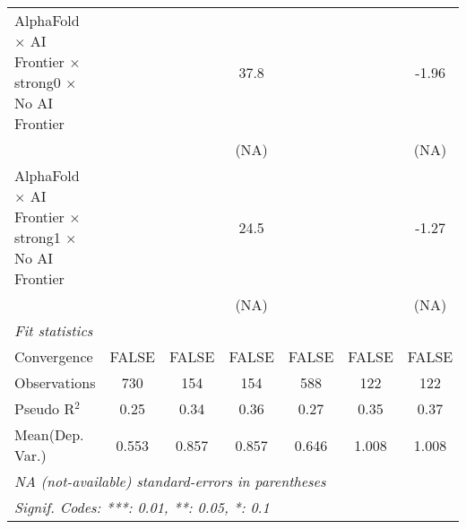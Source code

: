 \begin{tabular}{lcccccc}
   AlphaFold $\times$ AI Frontier $\times$ strong0 $\times$ No AI Frontier    &                        &       & 37.8   &                        &       & -1.96\\   
                                                                              &                        &       & (NA)   &                        &       & (NA)\\   
   AlphaFold $\times$ AI Frontier $\times$ strong1 $\times$ No AI Frontier    &                        &       & 24.5   &                        &       & -1.27\\   
                                                                              &                        &       & (NA)   &                        &       & (NA)\\   
   \midrule
   \emph{Fit statistics}\\
   Convergence                                                                &FALSE                   & FALSE & FALSE  & FALSE                  & FALSE & FALSE\\  
   Observations                                                               & 730                    & 154   & 154    & 588                    & 122   & 122\\  
   Pseudo R$^2$                                                               & 0.25                   & 0.34  & 0.36   & 0.27                   & 0.35  & 0.37\\  
Mean(Dep. Var.) & 0.553 & 0.857 & 0.857 & 0.646 & 1.008 & 1.008 \\
   \midrule \midrule
   \multicolumn{7}{l}{\emph{NA (not-available) standard-errors in parentheses}}\\
   \multicolumn{7}{l}{\emph{Signif. Codes: ***: 0.01, **: 0.05, *: 0.1}}\\
\end{tabular}
\par\endgroup

